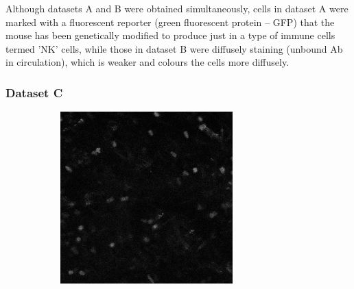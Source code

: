 	Although datasets A and B were obtained simultaneously, cells in dataset A were marked with a fluorescent reporter (green fluorescent protein -- GFP) that the mouse has been genetically modified to produce just in a type of immune cells termed 'NK' cells, while those in dataset B were diffusely staining (unbound Ab in circulation), which is weaker and colours the cells more diffusely.
	
	\subsubsection{Dataset C}
    \begin{figure}[h]
    	\begin{subfigure}{.32\textwidth}
    		\includegraphics[width=\textwidth]{images/series13greencropped008}
    	\end{subfigure}
    	\hfill
    	\begin{subfigure}{.32\textwidth}

\end{subfigure}
\end{figure}
